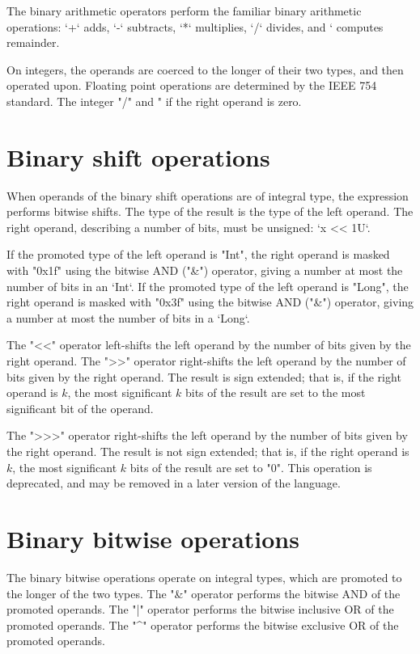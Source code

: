 The binary arithmetic operators perform the familiar binary arithmetic
operations: \xcd`+` adds, \xcd`-` subtracts, \xcd`*` multiplies, 
\xcd`/` divides, and \xcd`%
computes remainder.

On integers, the operands are coerced to the longer of their two types, and
then operated upon.  
Floating point operations are determined by the IEEE 754
standard. 
The integer \xcd"/" and \xcd"%
if the right operand is zero.



\section{Binary shift operations}

When operands of the binary shift operations are of integral type, the
expression performs bitwise shifts. 
The type of the result is the type of the left operand.
The right operand, describing a number of bits, must be unsigned: 
\xcd`x << 1U`.  


If the promoted type of the left operand is \xcd"Int",
the right operand is masked with \xcd"0x1f" using the bitwise
AND (\xcd"&") operator, giving a number at most the number of bits in an
\xcd`Int`. 
If the promoted type of the left operand is \xcd"Long",
the right operand is masked with \xcd"0x3f" using the bitwise
AND (\xcd"&") operator, giving a number at most the number of bits in a
\xcd`Long`. 

The \xcd"<<" operator left-shifts the left operand by the number of
bits given by the right operand.
The \xcd">>" operator right-shifts the left operand by the number of
bits given by the right operand.  The result is sign extended;
that is, if the right operand is $k$,
the most significant $k$ bits of the result are set to the most
significant bit of the operand.

The \xcd">>>" operator right-shifts the left operand by the number of
bits given by the right operand.  The result is not sign extended;
that is, if the right operand is $k$,
the most significant $k$ bits of the result are set to \xcd"0".
This operation is deprecated, and may be removed in a later version of the
language. 


\section{Binary bitwise operations}

The binary bitwise operations operate on integral types, which are promoted to
the longer of the two types.
The \xcd"&" operator  performs the bitwise AND of the promoted operands.
The \xcd"|" operator  performs the bitwise inclusive OR of the promoted operands.
The \xcd"^" operator  performs the bitwise exclusive OR of the promoted operands.

